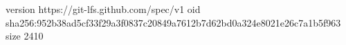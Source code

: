 version https://git-lfs.github.com/spec/v1
oid sha256:952b38ad5cf33f29a3f0837c20849a7612b7d62bd0a324e8021e26c7a1b5f963
size 2410
